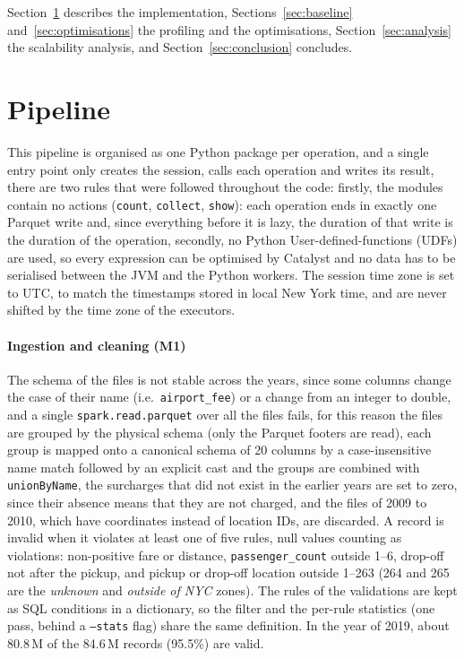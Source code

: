 \documentclass[sigconf]{acmart}
\begin{document}
Section~\ref{sec:design} describes the implementation,
Sections~\ref{sec:baseline} and~\ref{sec:optimisations} the profiling and the optimisations,
Section~\ref{sec:analysis} the scalability analysis, and Section~\ref{sec:conclusion} concludes.


\section{Pipeline}
\label{sec:design}

This pipeline is organised as one Python package per operation, and a single entry point only
creates the session, calls each operation and writes its result, there are two rules that were followed
throughout the code: firstly, the modules contain no actions (\texttt{count}, \texttt{collect},
\texttt{show}): each operation ends in exactly one Parquet write and, since everything before it
is lazy, the duration of that write is the duration of the operation, secondly, no Python User-defined-functions (UDFs)
are used, so every expression can be optimised by Catalyst and no data has to be serialised
between the JVM and the Python workers. The session time zone is set to UTC, to match the
timestamps stored in local New York time, and are never shifted by the time zone of the executors.


\paragraph{Ingestion and cleaning (M1)}
The schema of the files is not stable across the years, since some columns change the case of their
name (i.e.\ \texttt{airport\_fee}) or a change from an integer to double, and a single
\texttt{spark.read.parquet} over all the files fails, for this reason the files are grouped by
the physical schema (only the Parquet footers are read), each group is mapped onto a canonical schema
of 20 columns by a case-insensitive name match followed by an explicit cast and the groups are
combined with \texttt{unionByName}, the surcharges that did not exist in the earlier years are
set to zero, since their absence means that they are not charged, and the files of 2009 to 2010,
which have coordinates instead of location IDs, are discarded.
A record is invalid when it violates at least one of five rules, null values counting as violations: non-positive fare or distance, 
\texttt{passenger\_count} outside 1--6, drop-off not after the pickup,
and pickup or drop-off location outside 1--263 (264 and 265 are the \emph{unknown} and
\emph{outside of NYC} zones). The rules of the validations are kept as SQL conditions in a dictionary, so the
filter and the per-rule statistics (one pass, behind a \texttt{--stats} flag) share the same definition. 
In the year of 2019, about 80.8\,M of the 84.6\,M records (95.5\%) are valid.
\end{document}
